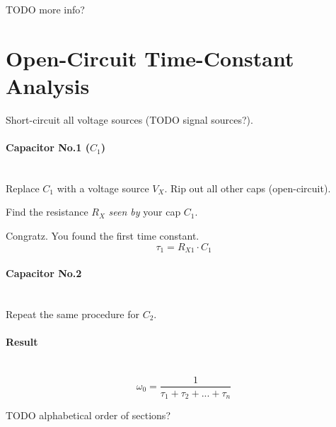 \documentclass[twocolumn]{article}
\begin{document}
    TODO more info?

  \section{Open-Circuit Time-Constant Analysis}
    Short-circuit all voltage sources (TODO signal sources?).

    \paragraph{Capacitor No.1 ($C_1$)} \hfill \\
      Replace $C_1$ with a voltage source $V_X$.
      Rip out all other caps (open-circuit).
  
      Find the resistance $R_X$ \emph{seen by} your cap $C_1$.
  
      Congratz. You found the first time constant.
      $$\tau_1 = R_{X1} \cdot C_1$$

    \paragraph{Capacitor No.2} \hfill \\
      Repeat the same procedure for $C_2$.

    \paragraph{Result} \hfill \\
      $$\omega_0 = \frac{1}{\tau_1 + \tau_2 + ... + \tau_n}$$

  TODO alphabetical order of sections?
\end{document}
